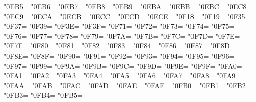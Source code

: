\XeTeXcharclass"0EB5=\KclassCM
\XeTeXcharclass"0EB6=\KclassCM
\XeTeXcharclass"0EB7=\KclassCM
\XeTeXcharclass"0EB8=\KclassCM
\XeTeXcharclass"0EB9=\KclassCM
\XeTeXcharclass"0EBA=\KclassCM
\XeTeXcharclass"0EBB=\KclassCM
\XeTeXcharclass"0EBC=\KclassCM
\XeTeXcharclass"0EC8=\KclassCM
\XeTeXcharclass"0EC9=\KclassCM
\XeTeXcharclass"0ECA=\KclassCM
\XeTeXcharclass"0ECB=\KclassCM
\XeTeXcharclass"0ECC=\KclassCM
\XeTeXcharclass"0ECD=\KclassCM
\XeTeXcharclass"0ECE=\KclassCM
\XeTeXcharclass"0F18=\KclassCM
\XeTeXcharclass"0F19=\KclassCM
\XeTeXcharclass"0F35=\KclassCM
\XeTeXcharclass"0F37=\KclassCM
\XeTeXcharclass"0F39=\KclassCM
\XeTeXcharclass"0F3E=\KclassCM
\XeTeXcharclass"0F3F=\KclassCM
\XeTeXcharclass"0F71=\KclassCM
\XeTeXcharclass"0F72=\KclassCM
\XeTeXcharclass"0F73=\KclassCM
\XeTeXcharclass"0F74=\KclassCM
\XeTeXcharclass"0F75=\KclassCM
\XeTeXcharclass"0F76=\KclassCM
\XeTeXcharclass"0F77=\KclassCM
\XeTeXcharclass"0F78=\KclassCM
\XeTeXcharclass"0F79=\KclassCM
\XeTeXcharclass"0F7A=\KclassCM
\XeTeXcharclass"0F7B=\KclassCM
\XeTeXcharclass"0F7C=\KclassCM
\XeTeXcharclass"0F7D=\KclassCM
\XeTeXcharclass"0F7E=\KclassCM
\XeTeXcharclass"0F7F=\KclassCM
\XeTeXcharclass"0F80=\KclassCM
\XeTeXcharclass"0F81=\KclassCM
\XeTeXcharclass"0F82=\KclassCM
\XeTeXcharclass"0F83=\KclassCM
\XeTeXcharclass"0F84=\KclassCM
\XeTeXcharclass"0F86=\KclassCM
\XeTeXcharclass"0F87=\KclassCM
\XeTeXcharclass"0F8D=\KclassCM
\XeTeXcharclass"0F8E=\KclassCM
\XeTeXcharclass"0F8F=\KclassCM
\XeTeXcharclass"0F90=\KclassCM
\XeTeXcharclass"0F91=\KclassCM
\XeTeXcharclass"0F92=\KclassCM
\XeTeXcharclass"0F93=\KclassCM
\XeTeXcharclass"0F94=\KclassCM
\XeTeXcharclass"0F95=\KclassCM
\XeTeXcharclass"0F96=\KclassCM
\XeTeXcharclass"0F97=\KclassCM
\XeTeXcharclass"0F99=\KclassCM
\XeTeXcharclass"0F9A=\KclassCM
\XeTeXcharclass"0F9B=\KclassCM
\XeTeXcharclass"0F9C=\KclassCM
\XeTeXcharclass"0F9D=\KclassCM
\XeTeXcharclass"0F9E=\KclassCM
\XeTeXcharclass"0F9F=\KclassCM
\XeTeXcharclass"0FA0=\KclassCM
\XeTeXcharclass"0FA1=\KclassCM
\XeTeXcharclass"0FA2=\KclassCM
\XeTeXcharclass"0FA3=\KclassCM
\XeTeXcharclass"0FA4=\KclassCM
\XeTeXcharclass"0FA5=\KclassCM
\XeTeXcharclass"0FA6=\KclassCM
\XeTeXcharclass"0FA7=\KclassCM
\XeTeXcharclass"0FA8=\KclassCM
\XeTeXcharclass"0FA9=\KclassCM
\XeTeXcharclass"0FAA=\KclassCM
\XeTeXcharclass"0FAB=\KclassCM
\XeTeXcharclass"0FAC=\KclassCM
\XeTeXcharclass"0FAD=\KclassCM
\XeTeXcharclass"0FAE=\KclassCM
\XeTeXcharclass"0FAF=\KclassCM
\XeTeXcharclass"0FB0=\KclassCM
\XeTeXcharclass"0FB1=\KclassCM
\XeTeXcharclass"0FB2=\KclassCM
\XeTeXcharclass"0FB3=\KclassCM
\XeTeXcharclass"0FB4=\KclassCM
\XeTeXcharclass"0FB5=\KclassCM
